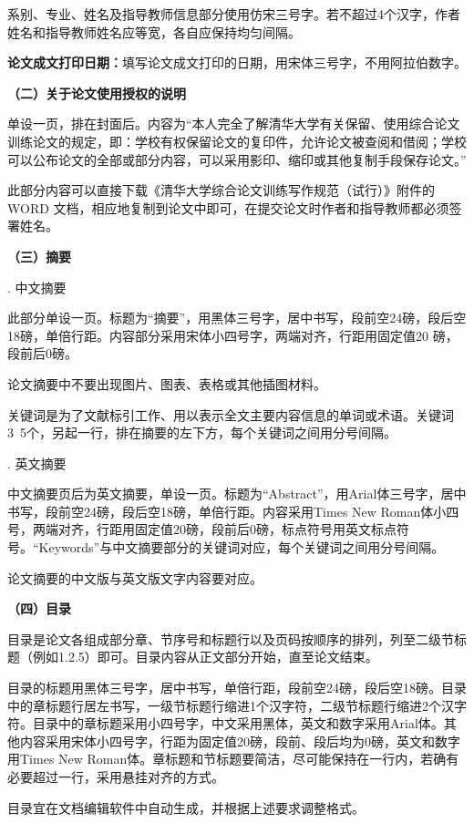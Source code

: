 \documentclass{Diploma}
\begin{document}
系别、专业、姓名及指导教师信息部分使用仿宋三号字。若不超过4个汉字，作者姓名和指导教师姓名应等宽，各自应保持均匀间隔。

\textbf{论文成文打印日期：}填写论文成文打印的日期，用宋体三号字，不用阿拉伯数字。

\noindent\textbf{（二）关于论文使用授权的说明}

单设一页，排在封面后。内容为“本人完全了解清华大学有关保留、使用综合论文训练论文的规定，即：学校有权保留论文的复印件，允许论文被查阅和借阅；学校可以公布论文的全部或部分内容，可以采用影印、缩印或其他复制手段保存论文。”

此部分内容可以直接下载《清华大学综合论文训练写作规范（试行）》附件的WORD 文档，相应地复制到论文中即可，在提交论文时作者和指导教师都必须签署姓名。

\noindent\textbf{（三）摘要}

. 中文摘要

此部分单设一页。标题为“摘要”，用黑体三号字，居中书写，段前空24磅，段后空18磅，单倍行距。内容部分采用宋体小四号字，两端对齐，行距用固定值20 磅，段前后0磅。

论文摘要中不要出现图片、图表、表格或其他插图材料。

关键词是为了文献标引工作、用以表示全文主要内容信息的单词或术语。关键词3~5个，另起一行，排在摘要的左下方，每个关键词之间用分号间隔。

. 英文摘要

中文摘要页后为英文摘要，单设一页。标题为“Abstract”，用Arial体三号字，居中书写，段前空24磅，段后空18磅，单倍行距。内容采用Times New Roman体小四号，两端对齐，行距用固定值20磅，段前后0磅，标点符号用英文标点符号。“Keywords”与中文摘要部分的关键词对应，每个关键词之间用分号间隔。

论文摘要的中文版与英文版文字内容要对应。

\noindent\textbf{（四）目录}

目录是论文各组成部分章、节序号和标题行以及页码按顺序的排列，列至二级节标题（例如1.2.5）即可。目录内容从正文部分开始，直至论文结束。

目录的标题用黑体三号字，居中书写，单倍行距，段前空24磅，段后空18磅。目录中的章标题行居左书写，一级节标题行缩进1个汉字符，二级节标题行缩进2个汉字符。目录中的章标题采用小四号字，中文采用黑体，英文和数字采用Arial体。其他内容采用宋体小四号字，行距为固定值20磅，段前、段后均为0磅，英文和数字用Times New Roman体。章标题和节标题要简洁，尽可能保持在一行内，若确有必要超过一行，采用悬挂对齐的方式。

目录宜在文档编辑软件中自动生成，并根据上述要求调整格式。
\end{document}
